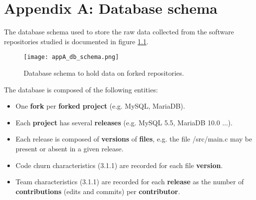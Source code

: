 
\chapter{Appendix A: Database schema} %

\label{AppendixA} %

The database schema used to store the raw data collected from the software repositories studied is
documented in figure \ref{fig:appA_db_schema}.

\begin{figure}[H]
  \centering
  \texttt{[image: appA\_db\_schema.png]}
  \caption{Database schema to hold data on forked repositories.}
  \label{fig:appA_db_schema}
\end{figure}


The database is composed of the following entities:
\begin{itemize}
  \item{One \textbf{fork} per \textbf{forked project} (e.g. MySQL, MariaDB).}
  \item{Each \textbf{project} has several \textbf{releases} (e.g. MySQL 5.5, MariaDB 10.0 ...).}
  \item{Each release is composed of \textbf{versions} of \textbf{files}, e.g. the file /src/main.c may be present or absent in a given release.}
  \item{Code churn characteristics (3.1.1) are recorded for each file \textbf{version}.}
  \item{Team characteristics (3.1.1) are recorded for each \textbf{release} as the number of
\textbf{contributions} (edits and commits) per \textbf{contributor}.}
\end{itemize}